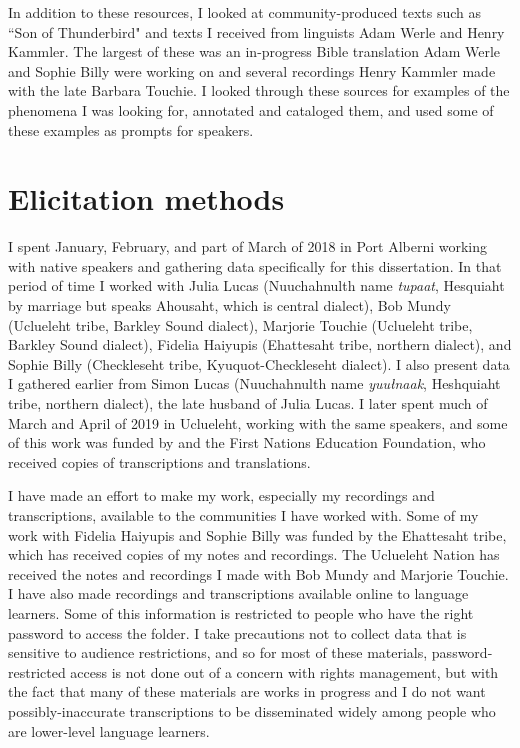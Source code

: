 In addition to these resources, I looked at community-produced texts such as ``Son of Thunderbird" and texts I received from linguists Adam Werle and Henry Kammler. The largest of these was an in-progress Bible translation Adam Werle and Sophie Billy were working on and several recordings Henry Kammler made with the late Barbara Touchie. I looked through these sources for examples of the phenomena I was looking for, annotated and cataloged them, and used some of these examples as prompts for speakers.

\section{Elicitation methods} \label{ch:method:elicitation}

I spent January, February, and part of March of 2018 in Port Alberni working with native speakers and gathering data specifically for this dissertation. In that period of time I worked with Julia Lucas (Nuuchahnulth name \textit{tupaat}, Hesquiaht by marriage but speaks Ahousaht, which is central dialect), Bob Mundy (Uclueleht tribe, Barkley Sound dialect), Marjorie Touchie (Uclueleht tribe, Barkley Sound dialect), Fidelia Haiyupis (Ehattesaht tribe, northern dialect), and Sophie Billy (Checkleseht tribe, Kyuquot-Checkleseht dialect). I also present data I gathered earlier from Simon Lucas (Nuuchahnulth name \textit{yuułnaak}, Heshquiaht tribe, northern dialect), the late husband of Julia Lucas. I later spent much of March and April of 2019 in Uclueleht, working with the same speakers, and some of this work was funded by and the First Nations Education Foundation, who received copies of transcriptions and translations.

I have made an effort to make my work, especially my recordings and transcriptions, available to the communities I have worked with. Some of my work with Fidelia Haiyupis and Sophie Billy was funded by the Ehattesaht tribe, which has received copies of my notes and recordings. The Uclueleht Nation has received the notes and recordings I made with Bob Mundy and Marjorie Touchie. I have also made recordings and transcriptions available online to language learners. Some of this information is restricted to people who have the right password to access the folder. I take precautions not to collect data that is sensitive to audience restrictions, and so for most of these materials, password-restricted access is not done out of a concern with rights management, but with the fact that many of these materials are works in progress and I do not want possibly-inaccurate transcriptions to be disseminated widely among people who are lower-level language learners.

